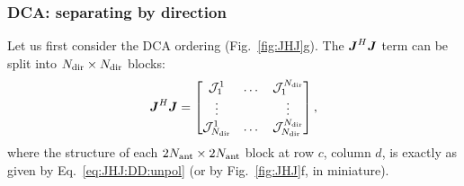 \documentclass[useAMS,usenatbib]{mn2e}
\makeatletter
\newcommand{\mat}[1]{{\bmath{#1}}}
\newcommand{\JJ}{\mat{J}} %
\newcommand{\JHJ}{\JJ^H\JJ} %
\newcommand{\Matrix}[2]{\left [ \begin{array}{@{}#1@{}}#2\end{array} \right ]}
\numberwithin{equation}{section}
\makeatother
\begin{document}
\subsubsection{DCA: separating by direction}
\label{sec:dca}

\newcommand{\JJJ}{\mathcal{J}}

Let us first consider the DCA ordering (Fig.~\ref{fig:JHJ}g). The $\JHJ$ term can be split into $N_\mathrm{dir}\times N_\mathrm{dir}$ blocks:
\begin{equation}
\label{eq:JHJ:DD:blocked}
\JHJ = \Matrix{ccc}{\JJJ^1_1 & \dots & \JJJ^{\Nd}_1 \\
\vdots & & \vdots \\
\JJJ_{\Nd}^1 & \dots & \JJJ_{\Nd}^{\Nd} },
\end{equation}
where the structure of each $2N_\mathrm{ant}\times2N_\mathrm{ant}$ block at row $c$, column $d$, is exactly as 
given by Eq.~\ref{eq:JHJ:DD:unpol} (or by Fig.~\ref{fig:JHJ}f, in miniature). 
\end{document}
